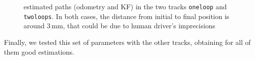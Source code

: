 \begin{figure}[htbp]
	\centering
	\caption{estimated paths (odometry and KF) in the two tracks \texttt{oneloop} and \texttt{twoloops}. In both cases, the distance from initial to final position is around $3\,\textrm{mm}$, that could be due to human driver's imprecisions}\label{figSigmaTuningPositions}
\end{figure}

Finally, we tested this set of parameters with the other tracks, obtaining for all of them good estimations.
